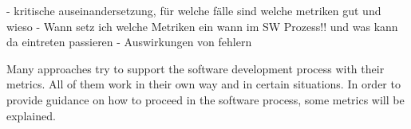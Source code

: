 - kritische auseinandersetzung, für welche fälle sind welche metriken gut und wieso
- Wann setz ich welche Metriken ein wann im SW Prozess!! und was kann da eintreten passieren
- Auswirkungen von fehlern

Many approaches try to support the software development process with their metrics. All of them work in their own way and in certain situations. 
In order to provide guidance on how to proceed in the software process, some metrics will be explained.